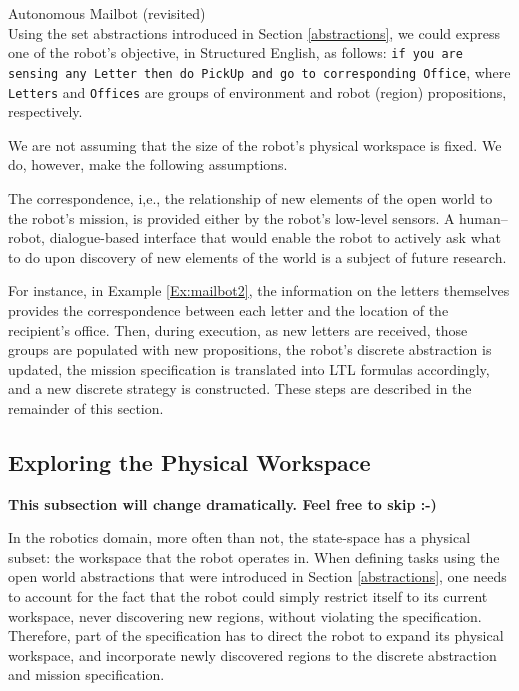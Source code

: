 \begin{myExample}\label{Ex:mailbot2} Autonomous Mailbot (revisited)\\
	Using the set abstractions introduced in Section \ref{abstractions}, we could express one of the robot's objective, in Structured English, as follows: 
\texttt{if you are sensing any Letter then do PickUp and go to corresponding Office}, where \texttt{Letters} and \texttt{Offices} are groups of environment and robot (region) propositions, respectively.
\end{myExample}

We are not assuming that the size of the robot's physical workspace is fixed. We do, however, make the following assumptions.

\begin{myAssumption}
	The correspondence, i,e., the relationship of new elements of the open world to the robot's mission, is provided either by the robot's low-level sensors. A human--robot, dialogue-based interface that would enable the robot to actively ask what to do upon discovery of new elements of the world is a subject of future research.
\end{myAssumption}

For instance, in Example \ref{Ex:mailbot2}, the information on the letters themselves provides the correspondence between each letter and the location of the recipient's office. Then, during execution, as new letters are received, those groups are populated with new propositions, the robot's discrete abstraction is updated, the mission specification is translated into LTL formulas accordingly, and a new discrete strategy is constructed. These steps are described in the remainder of this section.

\subsection{Exploring the Physical Workspace}

\textbf{This subsection will change dramatically. Feel free to skip :-)}

In the robotics domain, more often than not, the state-space has a physical subset: the workspace that the robot operates in. When defining tasks using the open world abstractions that were introduced in Section \ref{abstractions}, one needs to account for the fact that the robot could simply restrict itself to its current workspace, never discovering new regions, without violating the specification. Therefore, part of the specification has to direct the robot to expand its physical workspace, and incorporate newly discovered regions to the discrete abstraction and mission specification.

